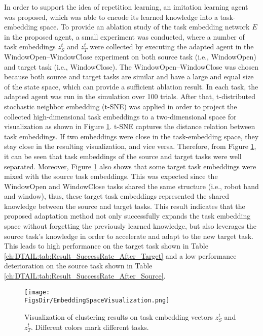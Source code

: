 In order to support the idea of repetition learning,
an imitation learning agent was proposed, which was able to encode its learned knowledge into a task-embedding space.
To provide an ablation study of the task embedding network $E$ in the proposed agent,
a small experiment was conducted, where a number of task embeddings $z^t_S$ and $z^t_T$ were collected by executing the adapted agent in the WindowOpen--WindowClose experiment on both source task (i.e., WindowOpen) and target task (i.e., WindowClose).
The WindowOpen--WindowClose was chosen because both source and target tasks are similar and have a large and equal size of the state space, which can provide a sufficient ablation result.
In each task,
the adapted agent was run in the simulation over 100 trials.
After that,
t-distributed stochastic neighbor embedding (t-SNE) was applied in order to project the collected high-dimensional task embeddings to a two-dimensional space for visualization as shown in Figure \ref{ch:DTAIL:fig:TSNE}.
t-SNE captures the distance relation between task embeddings.
If two embeddings were close in the task-embedding space,
they stay close in the resulting visualization,
and vice versa.
Therefore,
from Figure \ref{ch:DTAIL:fig:TSNE},
it can be seen that task embeddings of the source and target tasks were well separated.
Moreover,
Figure \ref{ch:DTAIL:fig:TSNE} also shows that some target task embeddings were mixed with the source task embeddings.
This was expected since the WindowOpen and WindowClose tasks shared the same structure (i.e., robot hand and window),
thus,
these target task embeddings represented the shared knowledge between the source and target tasks.
This result indicates that the proposed adaptation method not only successfully expands the task embedding space without forgetting the previously learned knowledge, but also leverages the source task's knowledge in order to accelerate and adapt to the new target task.
This leads to high performance on the target task shown in Table \ref{ch:DTAIL:tab:Result_SuccessRate_After_Target} and a low performance deterioration on the source task shown in Table \ref{ch:DTAIL:tab:Result_SuccessRate_After_Source}.


\begin{figure}[H]
  \centering
  \texttt{[image: \\FigsDir/EmbeddingSpaceVisualization.png]}
  \caption{Visualization of clustering results on task embedding vectors $z^t_S$ and $z^t_T$. Different colors mark different tasks.\label{ch:DTAIL:fig:TSNE}}
\end{figure}


